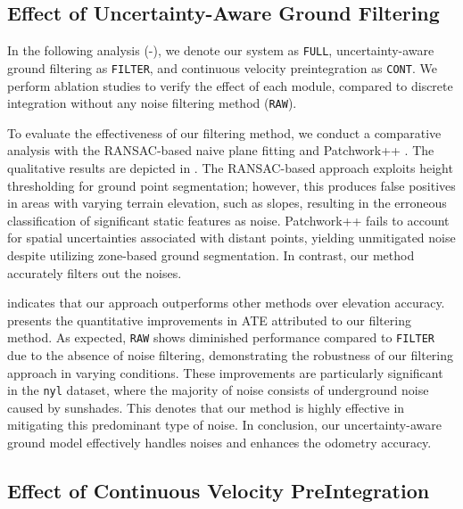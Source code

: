 

\subsection{Effect of Uncertainty-Aware Ground Filtering}
\label{subsec:ablation_ground}

In the following analysis (-), we denote our system as \texttt{FULL}, uncertainty-aware ground filtering as \texttt{FILTER}, and continuous velocity preintegration as \texttt{CONT}. We perform ablation studies to verify the effect of each module, compared to discrete integration without any noise filtering method (\texttt{RAW}).


To evaluate the effectiveness of our filtering method, we conduct a comparative analysis with the RANSAC-based naive plane fitting \cite{li20234d} and Patchwork++ \cite{lee2022patchworkpp}. The qualitative results are depicted in . The RANSAC-based approach exploits height thresholding for ground point segmentation; however, this produces false positives in areas with varying terrain elevation, such as slopes, resulting in the erroneous classification of significant static features as noise. Patchwork++ fails to account for spatial uncertainties associated with distant points, yielding unmitigated noise despite utilizing zone-based ground segmentation. In contrast, our method accurately filters out the noises.

 indicates that our approach outperforms other methods over elevation accuracy.
 presents the quantitative improvements in ATE attributed to our filtering method.
As expected, \texttt{RAW} shows diminished performance compared to \texttt{FILTER} due to the absence of noise filtering, demonstrating the robustness of our filtering approach in varying conditions.
These improvements are particularly significant in the \texttt{nyl} dataset, where the majority of noise consists of underground noise caused by sunshades. This denotes that our method is highly effective in mitigating this predominant type of noise.
In conclusion, our uncertainty-aware ground model effectively handles noises and enhances the odometry accuracy.

\subsection{Effect of Continuous Velocity PreIntegration}
\label{subsec:ablation_velgp}

